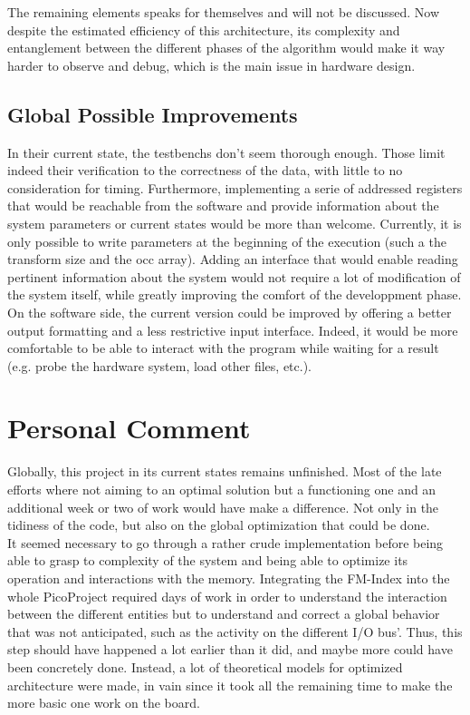 The remaining elements speaks for themselves and will not be discussed. Now despite the estimated efficiency of this architecture, its complexity and entanglement between the different phases of the algorithm would make it way harder to observe and debug, which is the main issue in hardware design.

\subsection{Global Possible Improvements}

In their current state, the testbenchs don't seem thorough enough. Those limit indeed their verification to the correctness of the data, with little to no consideration for timing. Furthermore, implementing a serie of addressed registers that would be reachable from the software and provide information about the system parameters or current states would be more than welcome. Currently, it is only possible to write parameters at the beginning of the execution (such a the transform size and the occ array). Adding an interface that would enable reading pertinent information about the system would not require a lot of modification of the system itself, while greatly improving the comfort of the developpment phase. \\


On the software side, the current version could be improved by offering a better output formatting and a less restrictive input interface. Indeed, it would be more comfortable to be able to interact with the program while waiting for a result (e.g. probe the hardware system, load other files, etc.).


\section{Personal Comment}

Globally, this project in its current states remains unfinished. Most of the late efforts where not aiming to an optimal solution but a functioning one and an additional week or two of work would have make a difference. Not only in the tidiness of the code, but also on the global optimization that could be done. \\

It seemed necessary to go through a rather crude implementation before being able to grasp to complexity of the system and being able to optimize its operation and interactions with the memory. Integrating the FM-Index into the whole PicoProject required days of work in order to understand the interaction between the different entities but to understand and correct a global behavior that was not anticipated, such as the activity on the different I/O bus'. Thus, this step should have happened a lot earlier than it did, and maybe more could have been concretely done. Instead, a lot of theoretical models for optimized architecture were made, in vain since it took all the remaining time to make the more basic one work on the board. \\

